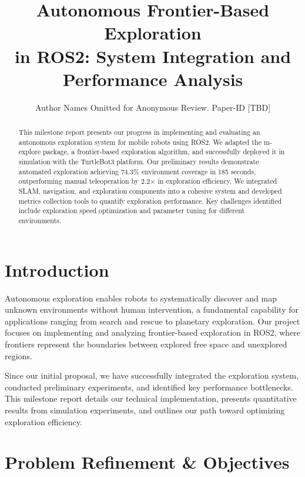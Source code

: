 \documentclass[conference]{IEEEtran}
\begin{document}
\title{Autonomous Frontier-Based Exploration\\ in ROS2: System Integration and Performance Analysis}

\author{Author Names Omitted for Anonymous Review. Paper-ID [TBD]}

\maketitle

\begin{abstract}
This milestone report presents our progress in implementing and evaluating an autonomous exploration system for mobile robots using ROS2. We adapted the m-explore package, a frontier-based exploration algorithm, and successfully deployed it in simulation with the TurtleBot3 platform. Our preliminary results demonstrate automated exploration achieving 74.3\% environment coverage in 185 seconds, outperforming manual teleoperation by 2.2$\times$ in exploration efficiency. We integrated SLAM, navigation, and exploration components into a cohesive system and developed metrics collection tools to quantify exploration performance. Key challenges identified include exploration speed optimization and parameter tuning for different environments.
\end{abstract}

\IEEEpeerreviewmaketitle

\section{Introduction}

Autonomous exploration enables robots to systematically discover and map unknown environments without human intervention, a fundamental capability for applications ranging from search and rescue to planetary exploration. Our project focuses on implementing and analyzing frontier-based exploration in ROS2, where frontiers represent the boundaries between explored free space and unexplored regions.

Since our initial proposal, we have successfully integrated the exploration system, conducted preliminary experiments, and identified key performance bottlenecks. This milestone report details our technical implementation, presents quantitative results from simulation experiments, and outlines our path toward optimizing exploration efficiency.

\section{Problem Refinement \& Objectives}
\end{document}
